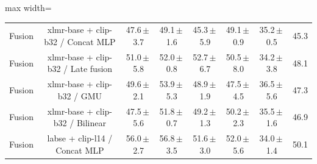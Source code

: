 \begin{table}[t]
\begin{adjustbox}{max width=\textwidth}
\begin{tabular}{lccccccc}
Fusion & xlmr-base + clip-b32 / Concat MLP & 47.6\,$\pm$\,3.7 & 49.1\,$\pm$\,1.6 & 45.3\,$\pm$\,5.9 & 49.1\,$\pm$\,0.9 & 35.2\,$\pm$\,0.5 & 45.3 \\
Fusion & xlmr-base + clip-b32 / Late fusion & 51.0\,$\pm$\,5.8 & 52.0\,$\pm$\,0.8 & 52.7\,$\pm$\,6.7 & 50.5\,$\pm$\,8.0 & 34.2\,$\pm$\,3.8 & 48.1 \\
Fusion & xlmr-base + clip-b32 / GMU & 49.6\,$\pm$\,2.1 & 53.9\,$\pm$\,5.3 & 48.9\,$\pm$\,1.9 & 47.5\,$\pm$\,4.5 & 36.5\,$\pm$\,5.6 & 47.3 \\
Fusion & xlmr-base + clip-b32 / Bilinear & 47.5\,$\pm$\,5.6 & 51.8\,$\pm$\,0.7 & 49.2\,$\pm$\,1.3 & 50.2\,$\pm$\,2.3 & 35.5\,$\pm$\,1.6 & 46.9 \\
Fusion & labse + clip-l14 / Concat MLP & 56.0\,$\pm$\,2.7 & 56.8\,$\pm$\,3.5 & 51.6\,$\pm$\,3.0 & 52.0\,$\pm$\,5.6 & 34.0\,$\pm$\,1.4 & 50.1 \\
\bottomrule
\end{tabular}
\end{adjustbox}
\end{table}
